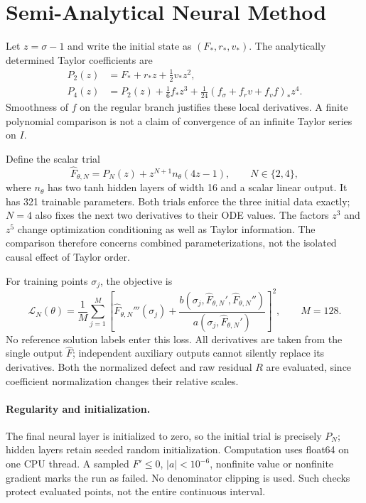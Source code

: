 \documentclass[11pt,a4paper]{article}
\theoremstyle{definition}
\theoremstyle{remark}
\begin{document}
\section{Semi-Analytical Neural Method}\label{sec:method}
Let $z=\sigma-1$ and write the initial state as $(F_*,r_*,v_*)$.
The analytically determined Taylor coefficients are
\begin{align}
P_2(z)&=F_*+r_*z+\tfrac12v_*z^2,\\
P_4(z)&=P_2(z)+\tfrac16 f_*z^3+
\tfrac1{24}(f_\sigma+f_rv+f_vf)_*z^4.
\label{eq:taylor}
\end{align}
Smoothness of $f$ on the regular branch justifies these local derivatives. A finite polynomial comparison is not a claim of convergence of an infinite Taylor series on $I$.

Define the scalar trial
\begin{equation}
\widehat F_{\theta,N}=P_N(z)+z^{N+1}n_\theta(4z-1),
\qquad N\in\{2,4\},
\label{eq:trial}
\end{equation}
where $n_\theta$ has two tanh hidden layers of width 16 and a scalar linear output. It has 321 trainable parameters. Both trials enforce the three initial data exactly; $N=4$ also fixes the next two derivatives to their ODE values. The factors $z^3$ and $z^5$ change optimization conditioning as well as Taylor information. The comparison therefore concerns combined parameterizations, not the isolated causal effect of Taylor order.

For training points $\sigma_j$, the objective is
\begin{equation}
\mathcal L_N(\theta)=\frac1{M}\sum_{j=1}^M
\left[
\widehat F_{\theta,N}'''(\sigma_j)
+\frac{b(\sigma_j,\widehat F_{\theta,N}',\widehat F_{\theta,N}'')}
{a(\sigma_j,\widehat F_{\theta,N}')}
\right]^2,\qquad M=128.
\label{eq:loss}
\end{equation}
No reference solution labels enter this loss. All derivatives are taken from the single output $\widehat F$; independent auxiliary outputs cannot silently replace its derivatives. Both the normalized defect and raw residual $R$ are evaluated, since coefficient normalization changes their relative scales.

\paragraph{Regularity and initialization.}
The final neural layer is initialized to zero, so the initial trial is precisely $P_N$; hidden layers retain seeded random initialization. Computation uses float64 on one CPU thread. A sampled $F'\le0$, $|a|<10^{-6}$, nonfinite value or nonfinite gradient marks the run as failed. No denominator clipping is used. Such checks protect evaluated points, not the entire continuous interval.
\end{document}
